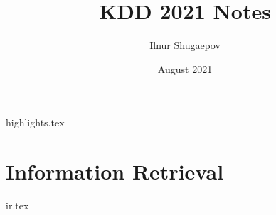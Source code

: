 \documentclass[openany,11pt]{book}
\title{KDD 2021 Notes}
\author{Ilnur Shugaepov}
\date{August 2021}
\begin{document}
\maketitle
\setcounter{tocdepth}{0}
\small{\tableofcontents}
\newpage

{highlights.tex}

\newpage
\part{Information Retrieval}
{ir.tex}
\end{document}
